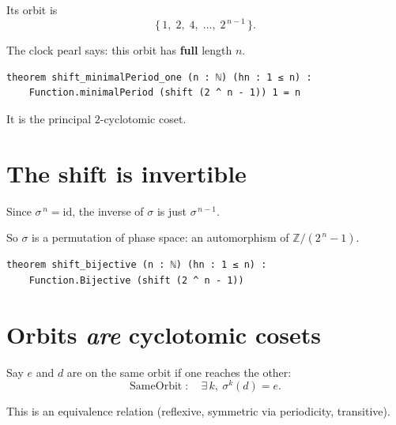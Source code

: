 \documentclass[11pt]{article}
\begin{document}
Its orbit is
\[
  \{\,1,\; 2,\; 4,\; \dots,\; 2^{\,n-1}\,\}.
\]

\bigskip

The clock pearl says: this orbit has \textbf{full} length $n$.

\begin{lstlisting}
theorem shift_minimalPeriod_one (n : ℕ) (hn : 1 ≤ n) :
    Function.minimalPeriod (shift (2 ^ n - 1)) 1 = n
\end{lstlisting}

\bigskip

It is the principal $2$-cyclotomic coset.

\bigskip


\newpage


\section{The shift is invertible}

\bigskip

Since $\sigma^{\,n} = \mathrm{id}$, the inverse of $\sigma$ is just $\sigma^{\,n-1}$.

\bigskip

So $\sigma$ is a permutation of phase space:
an automorphism of $\mathbb{Z}/(2^{\,n}-1)$.

\begin{lstlisting}
theorem shift_bijective (n : ℕ) (hn : 1 ≤ n) :
    Function.Bijective (shift (2 ^ n - 1))
\end{lstlisting}

\bigskip


\newpage


\section{Orbits \emph{are} cyclotomic cosets}

\bigskip

Say $e$ and $d$ are on the same orbit if one reaches the other:
\[
  \mathrm{SameOrbit}\;:\quad \exists\,k,\ \sigma^{k}(d) = e .
\]

\bigskip

This is an equivalence relation (reflexive, symmetric via periodicity,
transitive).

\bigskip
\end{document}
